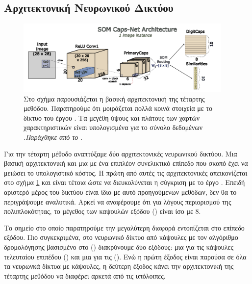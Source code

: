 \subsection{Αρχιτεκτονική Νευρωνικού Δικτύου}

\begin{figure}[h]
  \centering
  \includegraphics[width=0.95\textwidth]{images/chapter method/forth_method_architecture.pdf}
  \caption{Στο σχήμα παρουσιάζεται η βασική αρχιτεκτονική της τέταρτης μεθόδου. Παρατηρούμε ότι μοιράζεται πολλά κοινά στοιχεία με το δίκτυο του έργου \cite{sabour2017dynamic}. Τα μεγέθη ύψους και πλάτους των χαρτών χαρακτηριστικών είναι υπολογισμένα για το σύνολο δεδομένων .\textit{Παράχθηκε από το \href{https://inkscape.org/}{}}.}
  \label{fig:method_4_architecture}
\end{figure}

Για την τέταρτη μέθοδο αναπτύξαμε δύο αρχιτεκτονικές νευρωνικού δικτύου. Μια βασική αρχιτεκτονική και μια με ένα επιπλέον συνελικτικό επίπεδο που σκοπό έχει να μειώσει το υπολογιστικό κόστος. Η πρώτη από αυτές τις αρχιτεκτονικές απεικονίζεται στο σχήμα \ref{fig:method_4_architecture} και είναι τέτοια ώστε να διευκολύνεται η σύγκριση με το έργο \cite{sabour2017dynamic}. Επειδή αριστερό μέρος του δικτύου είναι ίδιο με αυτό προηγούμενων μεθόδων, δεν θα το περιγράψουμε αναλυτικά. Αρκεί να αναφέρουμε ότι για λόγους περιορισμού της πολυπλοκότητας, το μέγεθος των καψουλών εξόδου () είναι ίσο με 8.

Το σημείο στο οποίο παρατηρούμε την μεγαλύτερη διαφορά εντοπίζεται στο επίπεδο εξόδου. Πιο συγκεκριμένα, στο νευρωνικό δίκτυο από κάψουλες με τον αλγόριθμο δρομολόγησης βασισμένο στο  () διακρύνουμε δύο εξόδους: μια για τις κάψουλες τελευταίου επιπέδου () και μια για τις  (). Ενώ η πρώτη έξοδος είναι παρούσα σε όλα τα νευρωνκά δίκτυα με κάψουλες, η δεύτερη έξοδος κάνει την αρχιτεκτονική της τέταρτης μεθόδου να διαφέρει αρκετά από τις υπόλοιπες.\par

